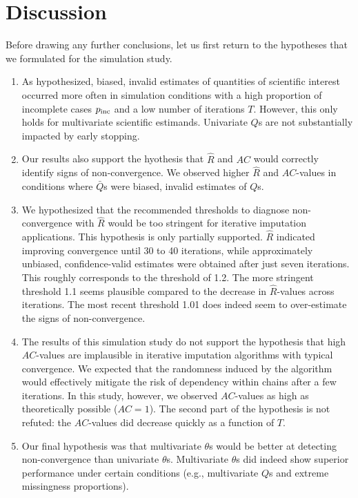 \documentclass[Royal,times,sageh]{sagej}
\begin{document}
\hypertarget{discussion}{%
\section{Discussion}\label{discussion}}

Before drawing any further conclusions, let us first return to the hypotheses that we formulated for the simulation study.

\begin{enumerate}
\def\labelenumi{\arabic{enumi}.}
\item
  As hypothesized, biased, invalid estimates of quantities of scientific interest occurred more often in simulation conditions with a high proportion of incomplete cases \(p_{\rm inc}\) and a low number of iterations \(T\). However, this only holds for multivariate scientific estimands. Univariate \(Q\)s are not substantially impacted by early stopping.
\item
  Our results also support the hyothesis that \(\widehat{R}\) and \(AC\) would correctly identify signs of non-convergence. We observed higher \(\widehat{R}\) and \(AC\)-values in conditions where \(\bar{Q}\)s were biased, invalid estimates of \(Q\)s.
\item
  We hypothesized that the recommended thresholds to diagnose non-convergence with \(\widehat{R}\) would be too stringent for iterative imputation applications. This hypothesis is only partially supported. \(\widehat{R}\) indicated improving convergence until 30 to 40 iterations, while approximately unbiased, confidence-valid estimates were obtained after just seven iterations. This roughly corresponds to the threshold of 1.2. The more stringent threshold 1.1 seems plausible compared to the decrease in \(\widehat{R}\)-values across iterations. The most recent threshold 1.01 does indeed seem to over-estimate the signs of non-convergence.
\item
  The results of this simulation study do not support the hypothesis that high \(AC\)-values are implausible in iterative imputation algorithms with typical convergence. We expected that the randomness induced by the algorithm would effectively mitigate the risk of dependency within chains after a few iterations. In this study, however, we observed \(AC\)-values as high as theoretically possible (\(AC=1\)). The second part of the hypothesis is not refuted: the \(AC\)-values did decrease quickly as a function of \(T\).
\item
  Our final hypothesis was that multivariate \(\theta\)s would be better at detecting non-convergence than univariate \(\theta\)s. Multivariate \(\theta\)s did indeed show superior performance under certain conditions (e.g., multivariate \(Q\)s and extreme missingness proportions).
\end{enumerate}
\end{document}
